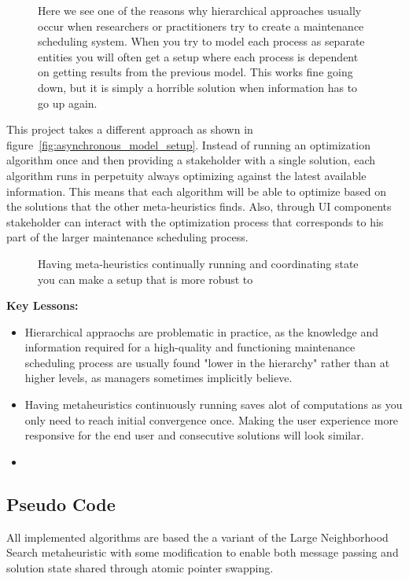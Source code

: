 \begin{figure}[H]
	\centering
	
	\caption{
		Here we see one of the reasons why hierarchical approaches usually occur when researchers or practitioners try to create a 
		maintenance scheduling system. When you try to model each process as separate entities you will often get a setup where each
		process is dependent on getting results from the previous model. This works fine going down, but it is simply a horrible solution
		when information has to go up again.  
	}
\end{figure}

This project takes a different approach as shown in figure~\ref{fig:asynchronous_model_setup}. Instead of running an optimization algorithm once and then providing a stakeholder with a single 
solution, each algorithm runs in perpetuity always optimizing against the latest available information. This means that each algorithm will
be able to optimize based on the solutions that the other meta-heuristics finds. Also, through UI components stakeholder can interact with the
optimization process that corresponds to his part of the larger maintenance scheduling process. 

\begin{figure}[H]
	\centering
	
	\caption{
		Having meta-heuristics continually running and coordinating state you can make a setup that is more robust to 
	}
	\label{
		fig:asynchronous_model_setup
	}
\end{figure}

\textbf{Key Lessons:}
\begin{itemize}
	\item Hierarchical appraochs are problematic in practice, as the knowledge and information required for a high-quality and functioning maintenance 
		  scheduling process are usually found "lower in the hierarchy" rather than at higher levels, as managers sometimes implicitly believe.
	\item Having metaheuristics continuously running saves alot of computations as you only need to reach initial convergence once. Making the 
	      user experience more responsive for the end user and consecutive solutions will look similar.
	\item  
\end{itemize}

\subsection*{Pseudo Code}

All implemented algorithms are based the a variant of the Large Neighborhood Search metaheuristic with some modification to enable both message
passing and solution state shared through atomic pointer swapping. 

\begin{figure}[H]
	
\end{figure}



